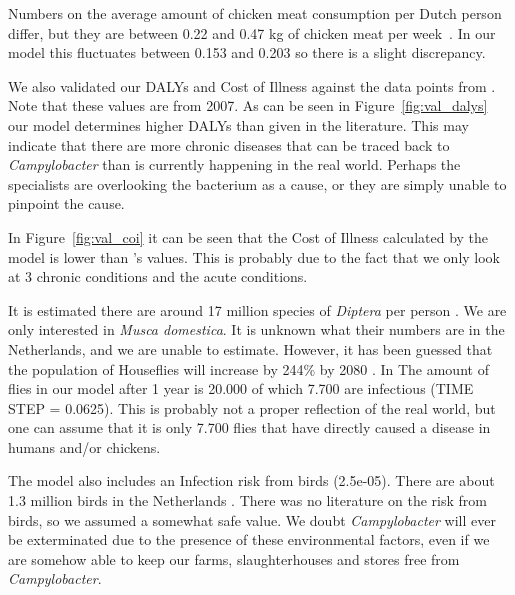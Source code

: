 Numbers on the average amount of chicken meat consumption per Dutch person differ, but they are between 0.22 and 0.47 kg of chicken meat per week~\parencite{schotman_europese_2018, waveningen_university__research_we_2020}. In our model this fluctuates between 0.153 and 0.203 so there is a slight discrepancy.

We also validated our DALYs and Cost of Illness against the data points from \parencite{mangen_campylobacteriosis_2007}. Note that these values are from 2007. As can be seen in Figure~\ref{fig:val_dalys} our model determines higher DALYs than given in the literature. This may indicate that there are more chronic diseases that can be traced back to \textit{Campylobacter} than is currently happening in the real world. Perhaps the specialists are overlooking the bacterium as a cause, or they are simply unable to pinpoint the cause.

In Figure~\ref{fig:val_coi} it can be seen that the Cost of Illness calculated by the model is lower than \citeauthor{mangen_campylobacteriosis_2007}'s values. This is probably due to the fact that we only look at 3 chronic conditions and the acute conditions. 

It is estimated there are around 17 million species of \textit{Diptera} per person \parencite{gorman_trillions_2017}. We are only interested in \textit{Musca domestica}. It is unknown what their numbers are in the Netherlands, and we are unable to estimate. However, it has been guessed that the population of Houseflies will increase by 244\% by 2080 \parencite{mcalister_secret_2017}. In The amount of flies in our model after 1 year is 20.000 of which 7.700 are infectious (TIME STEP = 0.0625). This is probably not a proper reflection of the real world, but one can assume that it is only 7.700 flies that have directly caused a disease in humans and/or chickens.

The model also includes an Infection risk from birds (2.5e-05). There are about 1.3 million birds in the Netherlands \parencite{noauthor_miljoenen_2019}. There was no literature on the risk from birds, so we assumed a somewhat safe value. We doubt \textit{Campylobacter} will ever be exterminated due to the presence of these environmental factors, even if we are somehow able to keep our farms, slaughterhouses and stores free from \textit{Campylobacter}.



